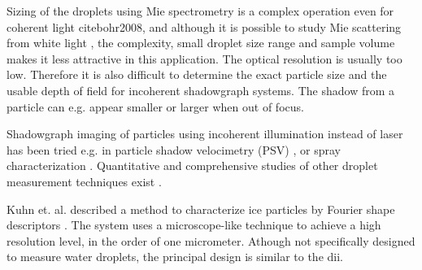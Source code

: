 Sizing of the droplets using Mie spectrometry is a complex operation even for coherent light cite{bohr2008}, and although it is possible to study Mie scattering from white light \cite{ward2008}, the complexity, small droplet size range and sample volume makes it less attractive in this application. The optical resolution is usually too low. Therefore it is also difficult to determine the exact particle size and the usable depth of field for incoherent shadowgraph systems. The shadow from a particle can e.g. appear smaller or larger when out of focus.

Shadowgraph imaging of particles using incoherent illumination instead of laser has been tried e.g. in particle shadow velocimetry (PSV) \cite{este2005}, or spray characterization \cite{will2010}. Quantitative and comprehensive studies of other droplet measurement techniques exist \cite{dye1984,henn2013,conno2007}.

Kuhn et. al. \cite{kuhn2012} described a method to characterize ice particles by Fourier shape descriptors \cite{gran1972,walla1980}. The system uses a microscope-like technique to achieve a high resolution level, in the order of one micrometer. Athough not specifically designed to measure water droplets, the principal design is similar to the \gls{dii}. 



